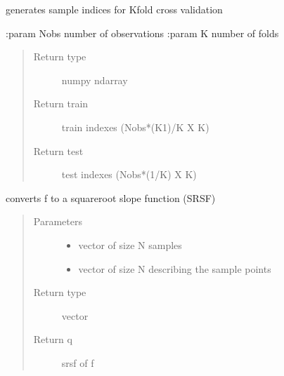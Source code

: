 \documentclass[letterpaper,10pt,english]{sphinxmanual}
\begin{document}
\begin{fulllineitems}
\label{\detokenize{utility_functions:utility_functions.f_K_fold}}
generates sample indices for K\sphinxhyphen{}fold cross validation

:param Nobs number of observations
:param K number of folds
\begin{quote}\begin{description}
\item[{Return type}] \leavevmode
numpy ndarray

\item[{Return train}] \leavevmode
train indexes (Nobs*(K\sphinxhyphen{}1)/K X K)

\item[{Return test}] \leavevmode
test indexes (Nobs*(1/K) X K)

\end{description}\end{quote}

\end{fulllineitems}


\begin{fulllineitems}
\label{\detokenize{utility_functions:utility_functions.f_to_srsf}}
converts f to a square\sphinxhyphen{}root slope function (SRSF)
\begin{quote}\begin{description}
\item[{Parameters}] \leavevmode\begin{itemize}
\item {} 
 \textendash{} vector of size N samples

\item {} 
 \textendash{} vector of size N describing the sample points

\end{itemize}

\item[{Return type}] \leavevmode
vector

\item[{Return q}] \leavevmode
srsf of f

\end{description}\end{quote}

\end{fulllineitems}
\end{document}
